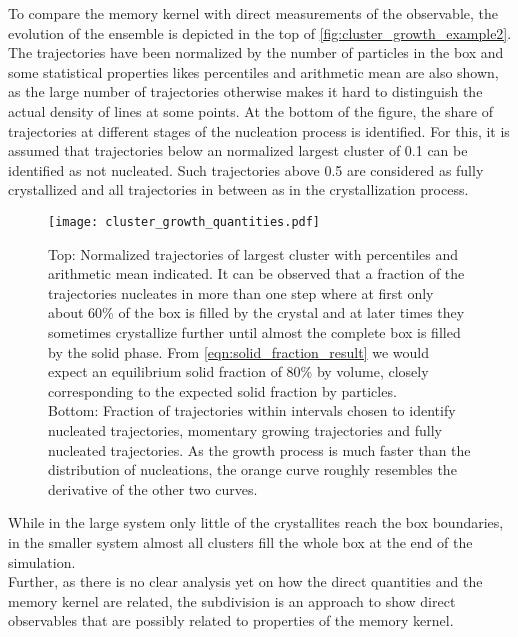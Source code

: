 To compare the memory kernel with direct measurements of the observable, the evolution of the ensemble is depicted in the top of \autoref{fig:cluster_growth_example2}. The trajectories have been normalized by the number of particles in the box and some statistical properties likes percentiles and arithmetic mean are also shown, as the large number of trajectories otherwise makes it hard to distinguish the actual density of lines at some points. At the bottom of the figure, the share of trajectories at different stages of the nucleation process is identified. For this, it is assumed that trajectories below an normalized largest cluster of 0.1 can be identified as not nucleated. Such trajectories above 0.5 are considered as fully crystallized and all trajectories in between as in the crystallization process.\\

\begin{figure}[h]
\centering
\texttt{[image: cluster\_growth\_quantities.pdf]}
\caption[Largest cluster trajectories of small system with percentiles and average]{Top: Normalized trajectories of largest cluster with percentiles and arithmetic mean indicated. It can be observed that a fraction of the trajectories nucleates in more than one step where at first only about 60\% of the box is filled by the crystal and at later times they sometimes crystallize further until almost the complete box is filled by the solid phase. From \autoref{eqn:solid_fraction_result} we would expect an equilibrium solid fraction of 80\% by volume, closely corresponding to the expected solid fraction by particles.\\
Bottom: Fraction of trajectories within intervals chosen to identify nucleated trajectories, momentary growing trajectories and fully nucleated trajectories. As the growth process is much faster than the distribution of nucleations, the orange curve roughly resembles the derivative of the other two curves.}
\label{fig:cluster_growth_example2}
\end{figure}

While in the large system only little of the crystallites reach the box boundaries, in the smaller system almost all clusters fill the whole box at the end of the simulation.\\
Further, as there is no clear analysis yet on how the direct quantities and the memory kernel are related, the subdivision is an approach to show direct observables that are possibly related to properties of the memory kernel.\\

